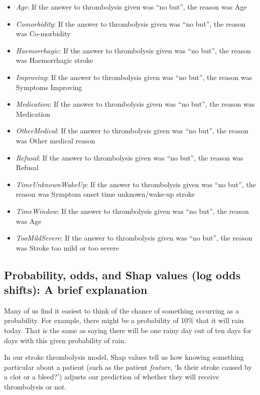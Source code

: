 \begin{itemize}
\item \emph{Age}: If the answer to thrombolysis given was ``no but'', the reason
  was Age
\item \emph{Comorbidity}: If the answer to thrombolysis given was ``no but'', the
  reason was Co-morbidity
\item \emph{Haemorrhagic}: If the answer to thrombolysis given was ``no but'', the
  reason was Haemorrhagic stroke
\item \emph{Improving}: If the answer to thrombolysis given was ``no but'', the
  reason was Symptoms Improving
\item \emph{Medication}: If the answer to thrombolysis given was ``no but'', the
  reason was Medication
\item \emph{OtherMedical}: If the answer to thrombolysis given was ``no but'', the
  reason was Other medical reason
\item \emph{Refusal}: If the answer to thrombolysis given was ``no but'', the
  reason was Refusal
\item \emph{TimeUnknownWakeUp}: If the answer to thrombolysis given was ``no but'',
  the reason was Symptom onset time unknown/wake-up stroke
\item \emph{TimeWindow}: If the answer to thrombolysis given was ``no but'', the
  reason was Age
\item \emph{TooMildSevere}: If the answer to thrombolysis given was ``no but'', the
  reason was Stroke too mild or too severe
\end{itemize}




\subsection{Probability, odds, and Shap values (log odds shifts): A brief explanation}

Many of us find it easiest to think of the chance of something occurring
as a probability. For example, there might be a probability of 10\% that
it will rain today. That is the same as saying there will be one rainy
day out of ten days for days with this given probability of rain.

In our stroke thrombolysis model, Shap values tell us how knowing
something particular about a patient (such as the patient
\emph{feature}, `Is their stroke caused by a clot or a bleed?') adjusts
our prediction of whether they will receive thrombolysis or not.

